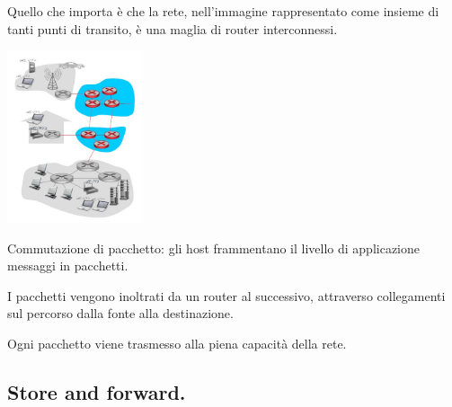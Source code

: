 \documentclass[10pt, a4paper, openany]{book}
\begin{document}
\noindent Quello che importa è che la rete, nell'immagine rappresentato come insieme di tanti punti di transito, è una maglia di router interconnessi.
\begin{center}
    \includegraphics[width=40mm]{cap1 - Introduzione alle reti - 8.jpg}
\end{center}
\noindent Commutazione di pacchetto: gli host frammentano il livello di applicazione messaggi in pacchetti.

\noindent I pacchetti vengono inoltrati da un router al successivo, attraverso collegamenti sul percorso dalla fonte alla destinazione.

\noindent Ogni pacchetto viene trasmesso alla piena capacità della rete.

\subsection{Store and forward.}
\end{document}
